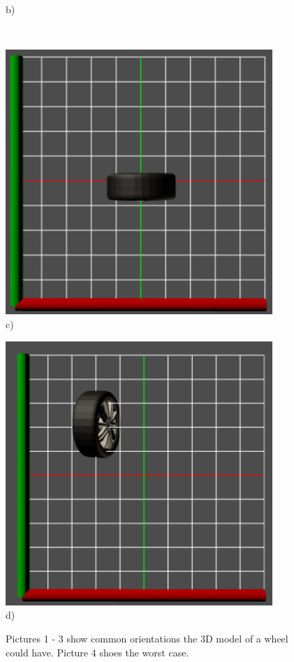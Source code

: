 \begin{figure}
\begin{minipage}{.5\textwidth}
    b)
  \end{minipage}\\
  \begin{minipage}{.5\textwidth}
    \centering
  	\includegraphics[width=0.9\textwidth]{../assets/wheel3.png}\\
    c)
  \end{minipage}
  \begin{minipage}{.5\textwidth}
    \centering
  	\includegraphics[width=0.9\textwidth]{../assets/wheel4.png}\\
    d)
  \end{minipage}
  \caption{Pictures 1 - 3 show common orientations the \gls{3D} model of a wheel could have. Picture 4 shoes the worst case.}
	\label{fig:wheel}
\end{figure}

